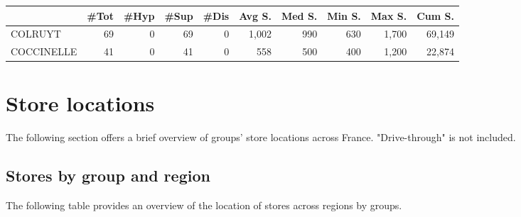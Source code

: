 \documentclass[11pt]{article}
\begin{document}
\begin{table}[H]
\footnotesize
\setlength{\tabcolsep}{2pt}

\begin{tabular}{lrrrrrrrrr}
\toprule
{} &       \#Tot &       \#Hyp &       \#Sup &       \#Dis &     Avg S. &     Med S. &     Min S. &     Max S. &     Cum S. \\
\midrule
COLRUYT    &         69 &          0 &         69 &          0 &      1,002 &        990 &        630 &      1,700 &     69,149 \\
COCCINELLE &         41 &          0 &         41 &          0 &        558 &        500 &        400 &      1,200 &     22,874 \\
\bottomrule
\end{tabular}

\end{table}

\section{Store locations}

The following section offers a brief overview of groups' store locations across France. "Drive-through" is not included.

\subsection{Stores by group and region}

The following table provides an overview of the location of stores across regions by groups.
\end{document}

